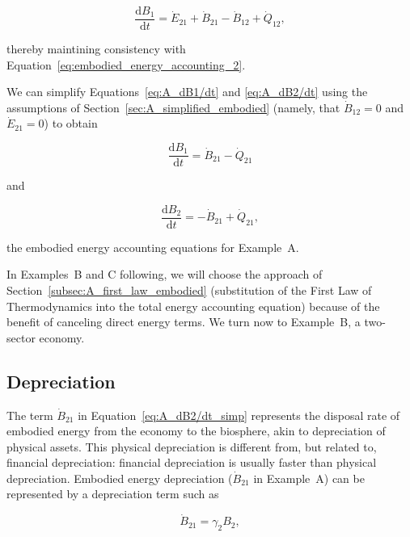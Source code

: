 \begin{equation} \label{eq:A_dB1/dt_waste_outflow}
	\frac{\mathrm{d}B_{1}}{\mathrm{d}t} 
	= \dot{E}_{21}
	+ \dot{B}_{21} 
	- \dot{B}_{12}
	+ \dot{Q}_{12},
\end{equation}

\noindent thereby maintining consistency with
Equation~\ref{eq:embodied_energy_accounting_2}.

We can simplify 
Equations~\ref{eq:A_dB1/dt} and \ref{eq:A_dB2/dt} 
using the assumptions of Section~\ref{sec:A_simplified_embodied} 
(namely, that $\dot{B}_{12} = 0$ and $\dot{E}_{21} = 0$)
to obtain

\begin{equation} \label{eq:A_dB1/dt_simp}
	\frac{\mathrm{d}B_{1}}{\mathrm{d}t} 
	= \dot{B}_{21} 
	- \dot{Q}_{21}
\end{equation}

\noindent and

\begin{equation} \label{eq:A_dB2/dt_simp}
	\frac{\mathrm{d}B_{2}}{\mathrm{d}t} 
	= - \dot{B}_{21}
	+ \dot{Q}_{21},
\end{equation}

\noindent the embodied energy accounting equations for 
Example~A.

In Examples~B and C following, we will choose the approach of 
Section~\ref{subsec:A_first_law_embodied} (substitution of the 
First Law of Thermodynamics into the total energy accounting equation)
because of the benefit of canceling direct energy terms. 
We turn now to Example~B, a two-sector economy.



\subsection{Depreciation}

The term $\dot{B}_{21}$ in Equation~\ref{eq:A_dB2/dt_simp}
represents the disposal rate 
of embodied energy from the economy to the biosphere, 
akin to depreciation of physical assets. 
This physical depreciation is different from, 
but related to, financial depreciation: 
financial depreciation is usually faster than physical depreciation. 
Embodied energy depreciation ($\dot{B}_{21}$ in Example~A) 
can be represented by a depreciation term such as

\begin{equation} \label{eq:depreciation_term_defined}
	\dot{B}_{21} = \gamma_{2}B_{2},
\end{equation}

